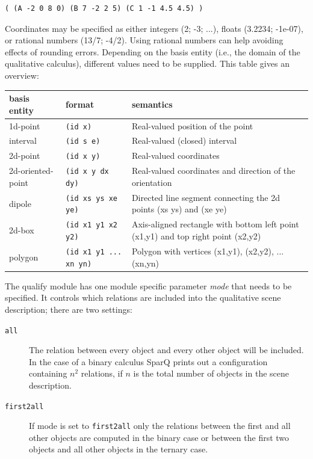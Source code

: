 \documentclass[headsepline]{scrreprt}
\theoremstyle{definition}
\newcommand{\engine}{SparQ}
\begin{document}
\begin{small}
\begin{verbatim}
( (A -2 0 8 0) (B 7 -2 2 5) (C 1 -1 4.5 4.5) )
\end{verbatim}
\end{small}

 Coordinates may be specified as either integers (2; -3; ...), floats (3.2234; -1e-07), or rational numbers (13/7; -4/2). Using rational numbers can help avoiding effects of rounding errors. Depending on the basis entity (i.e., the domain of the qualitative calculus), different values need to be supplied. This table gives an overview:

\begin{center}
\begin{tabular}{|llp{7cm}|}\hline
	{\bf basis entity} & {\bf format} & {\bf semantics}\\ \hline \hline
	1d-point & {\tt (id x)} & Real-valued position of the point \\
	interval & {\tt (id s e)} & Real-valued (closed) interval\\
	2d-point & {\tt (id x y)} & Real-valued coordinates \\
	2d-oriented-point & {\tt (id x y dx dy)} & Real-valued coordinates and direction of the orientation\\
	dipole & {\tt (id xs ys xe ye)} & Directed line segment connecting the 2d points (xs ys) and (xe ye)\\
	2d-box & {\tt (id x1 y1 x2 y2)} & Axis-aligned rectangle with bottom left point (x1,y1) and top right point (x2,y2)\\
	polygon & {\tt (id x1 y1 ... xn yn)} & Polygon with vertices (x1,y1), (x2,y2), ... (xn,yn)\\
	\hline
\end{tabular}
\end{center}

The qualify module has one module specific parameter {\em mode} that needs to be
specified. It controls which relations are included into the qualitative scene description; there are two settings:

\begin{description}
	\item[{\tt all}] The relation between every object and every other object will be included. In the case of a binary calculus \engine{} prints out a configuration containing $n^2$ relations, if $n$ is the total number of  objects in the scene description.

	\item[{\tt first2all}] If mode is set to {\tt first2all} only the relations between the first and all other objects are computed in the binary case or between the first two objects and all other objects in the ternary case.
\end{description}
\end{document}
